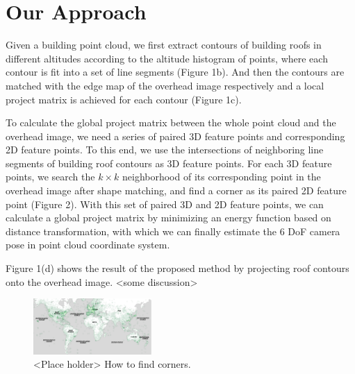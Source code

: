 \documentclass[sigconf,authorversion]{acmart}
\begin{document}
\section{Our Approach}
Given a building point cloud, we first extract contours of building roofs in different altitudes according to the altitude histogram of points, where each contour is fit into a set of line segments (Figure 1b). And then the contours are matched with the edge map of the overhead image respectively and a local project matrix is achieved for each contour (Figure 1c). 

To calculate the global project matrix between the whole point cloud and the overhead image, we need a series of paired 3D feature points and corresponding 2D feature points. To this end, we use the intersections of neighboring line segments of building roof contours as 3D feature points. 
For each 3D feature points, we search the $k\times k$ neighborhood of its corresponding point in the overhead image after shape matching, and find a corner as its paired 2D feature point (Figure 2).
With this set of paired 3D and 2D feature points, we can calculate a global project matrix by minimizing an energy function based on distance transformation, with which we can finally estimate the 6 DoF camera pose in point cloud coordinate system.

Figure 1(d) shows the result of the proposed method by projecting roof contours onto the overhead image. <some discussion>
\begin{figure}
	\centering
	\vspace{2.0cm}
	\includegraphics[width=0.4\textwidth]{map}
	\caption{<Place holder> How to find corners.}
	\label{fig:overview}
\end{figure}

 
\end{document}
